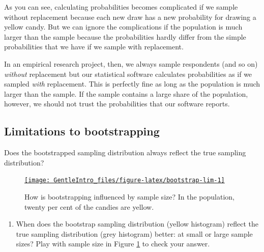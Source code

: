 \documentclass[a4paper]{book}
\providecommand{\tightlist}{%
  \setlength{\itemsep}{0pt}\setlength{\parskip}{0pt}}
\theoremstyle{definition}
\theoremstyle{definition}
\theoremstyle{definition}
\theoremstyle{remark}
\begin{document}
As you can see, calculating probabilities becomes complicated if we
sample without replacement because each new draw has a new probability
for drawing a yellow candy. But we can ignore the complications if the
population is much larger than the sample because the probabilities
hardly differ from the simple probabilities that we have if we sample
with replacement.

In an empirical research project, then, we always sample respondents
(and so on) \emph{without} replacement but our statistical software
calculates probabilities as if we sampled \emph{with} replacement. This
is perfectly fine as long as the population is much larger than the
sample. If the sample contains a large share of the population, however,
we should not trust the probabilities that our software reports.

\subsection{Limitations to
bootstrapping}\label{limitations-to-bootstrapping}

Does the bootstrapped sampling distribution always reflect the true
sampling distribution?

\begin{figure}[H]
\href{http://82.196.4.233:3838/apps/bootstrap-lim/}{\texttt{[image: GentleIntro\_files/figure-latex/bootstrap-lim-1]} }\caption{How is bootstrapping influenced by sample size? In the population, twenty per cent of the candies are yellow.}\label{fig:bootstrap-lim}
\end{figure}

\begin{enumerate}
\def\labelenumi{\arabic{enumi}.}
\tightlist
\item
  When does the bootstrap sampling distribution (yellow histogram)
  reflect the true sampling distribution (grey histogram) better: at
  small or large sample sizes? Play with sample size in Figure
  \ref{fig:bootstrap-lim} to check your answer.
\end{enumerate}
\end{document}
